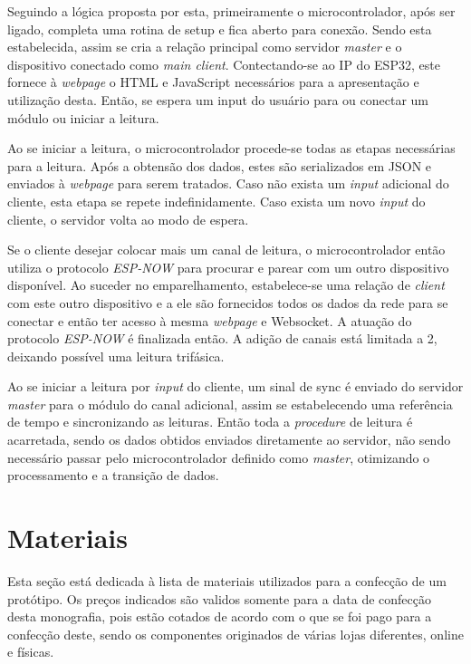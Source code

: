 Seguindo a lógica proposta por esta, primeiramente o microcontrolador, após ser ligado, completa uma rotina de setup e fica aberto para conexão. Sendo esta estabelecida, assim se cria a relação principal como servidor \textit{master} e o dispositivo conectado como \textit{main client}. Contectando-se ao IP do ESP32, este fornece à \textit{webpage} o HTML e JavaScript necessários para a apresentação e utilização desta. Então, se espera um input do usuário para ou conectar um módulo ou iniciar a leitura.

Ao se iniciar a leitura, o microcontrolador procede-se todas as etapas necessárias para a leitura. Após a obtensão dos dados, estes são serializados em JSON e enviados à \textit{webpage} para serem tratados. Caso não exista um \textit{input} adicional do cliente, esta etapa se repete indefinidamente. Caso exista um novo \textit{input} do cliente, o servidor volta ao modo de espera.

Se o cliente desejar colocar mais um canal de leitura, o microcontrolador então utiliza o protocolo \textit{ESP-NOW} para procurar e parear com um outro dispositivo disponível. Ao suceder no emparelhamento, estabelece-se uma relação de \textit{client} com este outro dispositivo e a ele são fornecidos todos os dados da rede para se conectar e então ter acesso à mesma \textit{webpage} e Websocket. A atuação do protocolo \textit{ESP-NOW} é finalizada então. A adição de canais está limitada a 2, deixando possível uma leitura trifásica.

Ao se iniciar a leitura por \textit{input} do cliente, um sinal de sync é enviado do servidor \textit{master} para o módulo do canal adicional, assim se estabelecendo uma referência de tempo e sincronizando as leituras. Então toda a \textit{procedure} de leitura é acarretada, sendo os dados obtidos enviados diretamente ao servidor, não sendo necessário passar pelo microcontrolador definido como \textit{master}, otimizando o processamento e a transição de dados.





\section{Materiais}\label{sec:materiais}

Esta seção está dedicada à lista de materiais utilizados para a confecção de um protótipo. Os preços indicados são validos somente para a data de confecção desta monografia, pois estão cotados de acordo com o que se foi pago para a confecção deste, sendo os componentes originados de várias lojas diferentes, online e físicas.

